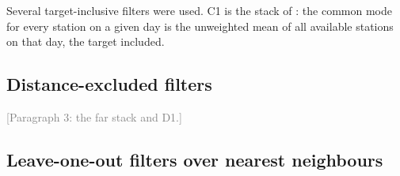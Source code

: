 \documentclass[preprint,12pt,authoryear]{elsarticle}
\newcommand{\towrite}[1]{\textcolor{gray}{[#1]}}
\begin{document}
Several target-inclusive filters were used. C1 is the stack of \citet{wdowinski1997}: the common mode for every station on a given day is the unweighted mean of all available stations on that day, the target included.

\subsection{Distance-excluded filters}
\label{sec:filters-distance}

\towrite{Paragraph 3: the far stack and D1.}

\subsection{Leave-one-out filters over nearest neighbours}
\label{sec:filters-loo}
\end{document}
